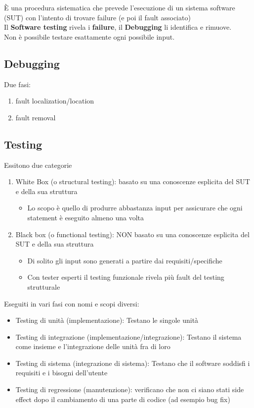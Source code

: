 \`E una procedura sistematica che prevede l’esecuzione di un sistema software (SUT) con l’intento di trovare failure (e poi il fault associato)\\
Il \textbf{Software testing} rivela i \textbf{failure}, il \textbf{Debugging} li identifica e rimuove.\\
Non \`e possibile testare esattamente ogni possibile input.

\subsection{Debugging}
Due fasi:
\begin{enumerate}
    \item fault localization/location
    \item fault removal
\end{enumerate}

\subsection{Testing}
Essitono due categorie
\begin{enumerate}
    \item White Box (o structural testing): basato su una conoscenze esplicita del SUT e della sua struttura
    \begin{itemize}
        \item Lo scopo è quello di produrre abbastanza input per assicurare che ogni statement è eseguito almeno una volta
    \end{itemize}
    
    \item Black box (o functional testing): NON basato su una conoscenze esplicita del SUT e della sua struttura
    \begin{itemize}
        \item Di solito gli input sono generati a partire dai requisiti/specifiche
        \item Con tester esperti il testing funzionale rivela più fault del testing strutturale
    \end{itemize}
\end{enumerate}

\break
\noindent Eseguiti in vari fasi con nomi e scopi diversi:
\begin{itemize}
    \item Testing di unità (implementazione): Testano le singole unità
    \item Testing di integrazione (implementazione/integrazione): Testano il sistema come insieme e l'integrazione delle unità fra di loro
    \item Testing di sistema (integrazione di sistema): Testano che il software soddisfi i requisiti e i bisogni dell'utente
    \item Testing di regressione (manutenzione): verificano che non ci siano stati side effect dopo il cambiamento di una parte di codice (ad esempio bug fix)
\end{itemize}

